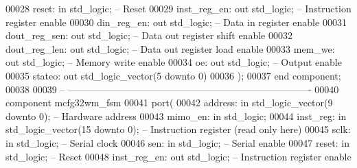 \begin{DoxyCode}
00028         reset: \textcolor{keywordflow}{in} \textcolor{comment}{std\_logic};                \textcolor{keyword}{-- Reset}
00029         inst\_reg\_en: \textcolor{keywordflow}{out} \textcolor{comment}{std\_logic};         \textcolor{keyword}{-- Instruction register enable}
00030         din\_reg\_en: \textcolor{keywordflow}{out} \textcolor{comment}{std\_logic};          \textcolor{keyword}{-- Data in register enable}
00031         dout\_reg\_sen: \textcolor{keywordflow}{out} \textcolor{comment}{std\_logic};            \textcolor{keyword}{-- Data out register shift enable}
00032         dout\_reg\_len: \textcolor{keywordflow}{out} \textcolor{comment}{std\_logic};            \textcolor{keyword}{-- Data out register load enable}
00033         mem\_we: \textcolor{keywordflow}{out} \textcolor{comment}{std\_logic};              \textcolor{keyword}{-- Memory write enable}
00034         oe: \textcolor{keywordflow}{out} \textcolor{comment}{std\_logic};              \textcolor{keyword}{-- Output enable}
00035         stateo: \textcolor{keywordflow}{out} \textcolor{comment}{std\_logic\_vector}(\textcolor{vhdllogic}{}\textcolor{vhdllogic}{5} \textcolor{keywordflow}{downto} \textcolor{vhdllogic}{}\textcolor{vhdllogic}{0})
00036     );
00037 \textcolor{keywordflow}{end} \textcolor{keywordflow}{component};
00038 
00039 \textcolor{keyword}{-- ----------------------------------------------------------------------------}
00040 \textcolor{keywordflow}{component} mcfg32wm_fsm
00041     \textcolor{keywordflow}{port}(
00042         address: \textcolor{keywordflow}{in} \textcolor{comment}{std\_logic\_vector}(\textcolor{vhdllogic}{}\textcolor{vhdllogic}{9} \textcolor{keywordflow}{downto} \textcolor{vhdllogic}{}\textcolor{vhdllogic}{0});   \textcolor{keyword}{-- Hardware address}
00043         mimo_en: \textcolor{keywordflow}{in} \textcolor{comment}{std\_logic};
00044         inst_reg: \textcolor{keywordflow}{in} \textcolor{comment}{std\_logic\_vector}(\textcolor{vhdllogic}{}\textcolor{vhdllogic}{15} \textcolor{keywordflow}{downto} \textcolor{vhdllogic}{}\textcolor{vhdllogic}{0}); \textcolor{keyword}{-- Instruction register (read only here)}
00045         sclk: \textcolor{keywordflow}{in} \textcolor{comment}{std\_logic};             \textcolor{keyword}{-- Serial clock}
00046         sen: \textcolor{keywordflow}{in} \textcolor{comment}{std\_logic};              \textcolor{keyword}{-- Serial enable}
00047         reset: \textcolor{keywordflow}{in} \textcolor{comment}{std\_logic};                \textcolor{keyword}{-- Reset}
00048         inst_reg_en: \textcolor{keywordflow}{out} \textcolor{comment}{std\_logic};         \textcolor{keyword}{-- Instruction register enable}

\end{DoxyCode}
